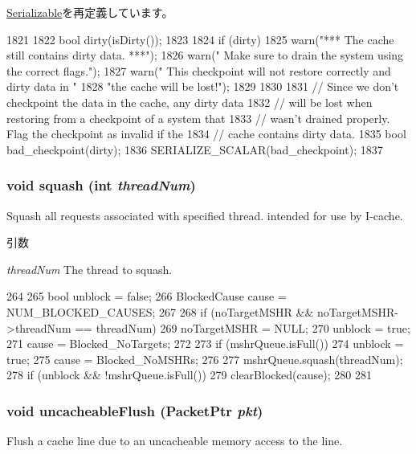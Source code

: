 \hyperlink{classSerializable_ad6272f80ae37e8331e3969b3f072a801}{Serializable}を再定義しています。


\begin{DoxyCode}
1821 {
1822     bool dirty(isDirty());
1823 
1824     if (dirty) {
1825         warn("*** The cache still contains dirty data. ***\n");
1826         warn("    Make sure to drain the system using the correct flags.\n");
1827         warn("    This checkpoint will not restore correctly and dirty data in "
1828              "the cache will be lost!\n");
1829     }
1830 
1831     // Since we don't checkpoint the data in the cache, any dirty data
1832     // will be lost when restoring from a checkpoint of a system that
1833     // wasn't drained properly. Flag the checkpoint as invalid if the
1834     // cache contains dirty data.
1835     bool bad_checkpoint(dirty);
1836     SERIALIZE_SCALAR(bad_checkpoint);
1837 }
\end{DoxyCode}
\hypertarget{classCache_a94c2c174856cbab1e3478cb02ae8ed80}{
\subsubsection[{squash}]{\setlength{\rightskip}{0pt plus 5cm}void squash (int {\em threadNum})}}
\label{classCache_a94c2c174856cbab1e3478cb02ae8ed80}
Squash all requests associated with specified thread. intended for use by I-\/cache. 
\begin{DoxyParams}{引数}
\item[{\em threadNum}]The thread to squash. \end{DoxyParams}



\begin{DoxyCode}
264 {
265     bool unblock = false;
266     BlockedCause cause = NUM_BLOCKED_CAUSES;
267 
268     if (noTargetMSHR && noTargetMSHR->threadNum == threadNum) {
269         noTargetMSHR = NULL;
270         unblock = true;
271         cause = Blocked_NoTargets;
272     }
273     if (mshrQueue.isFull()) {
274         unblock = true;
275         cause = Blocked_NoMSHRs;
276     }
277     mshrQueue.squash(threadNum);
278     if (unblock && !mshrQueue.isFull()) {
279         clearBlocked(cause);
280     }
281 }
\end{DoxyCode}
\hypertarget{classCache_af5dfa0f9fd3542f24b728e25a1d658b2}{
\subsubsection[{uncacheableFlush}]{\setlength{\rightskip}{0pt plus 5cm}void uncacheableFlush ({\bf PacketPtr} {\em pkt})}}
\label{classCache_af5dfa0f9fd3542f24b728e25a1d658b2}
Flush a cache line due to an uncacheable memory access to the line.


